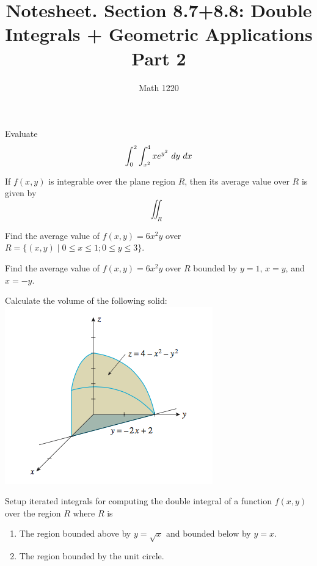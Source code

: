\documentclass[12pt, a4paper]{article}
\author{Math 1220}
\title{Notesheet. Section 8.7+8.8: Double Integrals + Geometric
  Applications Part 2}
\date{}
\begin{document}
\maketitle
\nameline
\begin{ex}
  Evaluate \[
    \int_0^2 \int_{x^2}^4 x e^{y^2}\ dy \ d x
  \]
\end{ex}
\begin{thrm}
  If \(f(x,y)\) is integrable over the plane region \(R\), then its
  average value over \(R\) is given by \[
    \iint_R
  \]
\end{thrm}
\begin{ex}
  Find the average value of \(f(x,y) = 6x^2y\) over \(R = \{(x,y) \mid
  0 \leq x \leq 1; 0 \leq y \leq 3\}\). 
\end{ex}
\pagebreak
\begin{ex}
  Find the average value of \(f(x,y) = 6x^2 y\) over \(R\) bounded by
  \(y=1\), \(x=y\), and \(x=-y\).
\end{ex}
\begin{ex}
  Calculate the volume of the following solid:\\
  \includegraphics[scale=0.7]{images/solid-for-volume-calc}
\end{ex}
\vspace{-1.5in}
\begin{ex}
  Setup iterated integrals for computing the double integral of a
  function \(f(x,y)\) over the region \(R\) where \(R\) is
  \begin{enumerate}
  \item The region bounded above by \(y=\sqrt{x}\) and bounded below
    by \(y=x\).
    \vspace{1.25in}
  \item The region bounded by the unit circle.
  \end{enumerate}

\end{ex}
\end{document}
